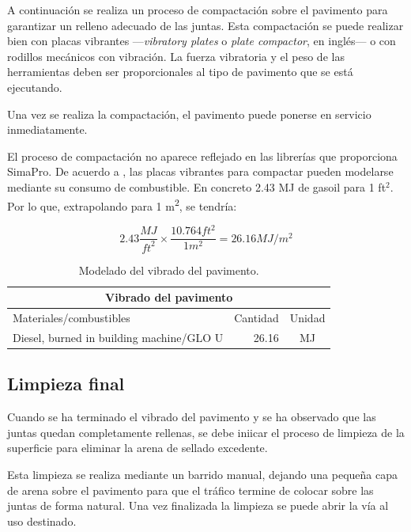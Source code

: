 A continuación se realiza un proceso de compactación sobre el pavimento para garantizar un relleno adecuado de las juntas. Esta compactación se puede realizar bien con placas vibrantes —\textit{vibratory plates} o \textit{plate compactor}, en inglés— o con rodillos mecánicos con vibración. La fuerza vibratoria y el peso de las herramientas deben ser proporcionales al tipo de pavimento que se está ejecutando.

Una vez se realiza la compactación, el pavimento puede ponerse en servicio inmediatamente.

El proceso de compactación no aparece reflejado en las librerías que proporciona SimaPro. De acuerdo a \cite{rieradevall}, las placas vibrantes para compactar pueden modelarse mediante su consumo de combustible. En concreto 2.43 \si{MJ} de gasoil para 1 ft$^2$. Por lo que, extrapolando para 1 \si{m^2}, se tendría:

\begin{equation}
2.43\frac{MJ}{{ft}^2} \times \frac{10.764{ft^2}}{1m^2}=26.16MJ/m^2
\end{equation}

\begin{table}[!htb]
\centering
\begin{tabular}{p{8cm}rc}
\toprule
\multicolumn{3}{c}{Vibrado del pavimento}\\
\midrule
Materiales/combustibles & Cantidad & Unidad\\
\midrule
Diesel, burned in building machine/GLO U & 26.16 & \si{MJ}\\
\bottomrule
\end{tabular}
\caption{Modelado del vibrado del pavimento.}
\label{modeladovibrado}
\end{table}

\subsection{Limpieza final}

Cuando se ha terminado el vibrado del pavimento y se ha observado que las juntas quedan completamente rellenas, se debe iniicar el proceso de limpieza de la superficie para eliminar la arena de sellado excedente.

Esta limpieza se realiza mediante un barrido manual, dejando una pequeña capa de arena sobre el pavimento para que el tráfico termine de colocar sobre las juntas de forma natural. Una vez finalizada la limpieza se puede abrir la vía al uso destinado.

